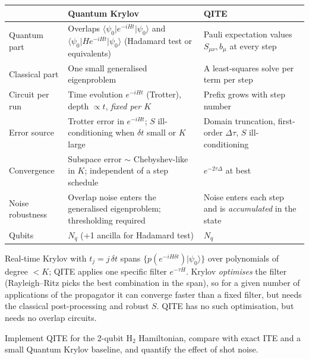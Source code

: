 \documentclass[11pt,a4paper]{article}
\newcommand{\ket}[1]{\lvert #1\rangle}
\newcommand{\bra}[1]{\langle #1\rvert}
\begin{document}
\begin{center}
\small\begin{tabular}{@{}p{2.6cm}p{5.2cm}p{5.2cm}@{}}
\toprule
 & Quantum Krylov & QITE\\
\midrule
Quantum part & Overlaps $\bra{\psi_0}e^{-iHt}\ket{\psi_0}$ and $\bra{\psi_0}He^{-iHt}\ket{\psi_0}$ (Hadamard test or equivalents) & Pauli expectation values $S_{\mu\nu},b_\mu$ at every step\\
Classical part & One small generalised eigenproblem & A least-squares solve per term per step\\
Circuit per run & Time evolution $e^{-iHt}$ (Trotter), depth $\propto t$, \emph{fixed per $K$} & Prefix grows with step number\\
Error source & Trotter error in $e^{-iHt}$; $S$ ill-conditioning when $\delta t$ small or $K$ large & Domain truncation, first-order $\Delta\tau$, $S$ ill-conditioning\\
Convergence & Subspace error $\sim$ Chebyshev-like in $K$; independent of a step schedule & $e^{-2\tau\Delta}$ at best\\
Noise robustness & Overlap noise enters the generalised eigenproblem; thresholding required & Noise enters each step and is \emph{accumulated} in the state\\
Qubits & $N_q$ (+1 ancilla for Hadamard test) & $N_q$\\
\bottomrule
\end{tabular}
\end{center}

\begin{remark}
Real-time Krylov with $t_j=j\,\delta t$ spans $\{p(e^{-iH\delta t})\ket{\psi_0}\}$ over polynomials of
degree $<K$; QITE applies one specific filter $e^{-\tau H}$. Krylov \emph{optimises} the filter
(Rayleigh--Ritz picks the best combination in the span), so for a given number of applications of
the propagator it can converge faster than a fixed filter, but needs the classical post-processing
and robust $S$. QITE has no such optimisation, but needs no overlap circuits.
\end{remark}

\label{sec:numerics}

\begin{question}
Implement QITE for the 2-qubit $\mathrm{H}_2$ Hamiltonian, compare with exact ITE and a small
Quantum Krylov baseline, and quantify the effect of shot noise.
\end{question}
\end{document}
